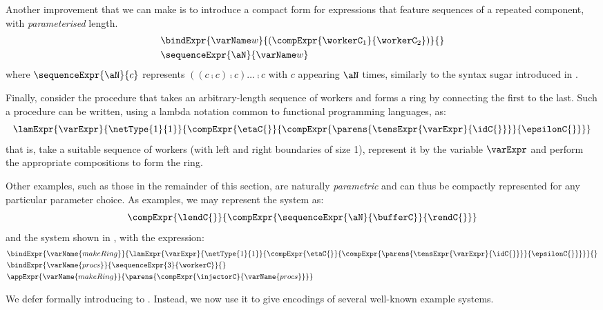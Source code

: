 Another improvement that we can make is to introduce a compact form for
expressions that feature sequences of a repeated component, with
\emph{parameterised}
length.
\begin{align*}
    &\bindExpr
        {\workerVar}
        {(\compExpr
            {\workerC_1}
            {\workerC_2})}{} \\
    &\sequenceExpr{\aN}{\workerVar}
\end{align*}
where $\sequenceExpr{\aN}{c}$ represents $((c \comp c) \comp c) \dots \comp c$
with $c$ appearing $\aN$ times, similarly to the syntax sugar introduced in
.

Finally, consider the procedure that takes an arbitrary-length sequence of
workers and forms a ring by connecting the first to the last. Such a procedure
can be written, using a lambda notation common to functional programming
languages, as:
\[
    \lamExpr{\varExpr}{\netType{1}{1}}
        {\compExpr{\etaC{}}
                  {\compExpr{\parens{\tensExpr{\varExpr}{\idC{}}}}
                            {\epsilonC{}}}}
\]
that is, take a suitable sequence of workers (with left and right boundaries of
size 1), represent it by the variable $\varExpr$ and perform the appropriate
compositions to form the ring.

Other examples, such as those in the remainder of this section, are naturally
\emph{parametric} and can thus be compactly represented for any particular
parameter choice. As examples, we may represent the \bufferSys{\aN} system
as:
\[
    \compExpr{\lendC{}}{\compExpr{\sequenceExpr{\aN}{\bufferC}}{\rendC{}}}
\]
and the  system shown in , with the
expression:
\begin{align*}
    &\bindExpr
        {\varName{makeRing}}
        {\lamExpr{\varExpr}{\netType{1}{1}}
                 {\compExpr{\etaC{}}
                           {\compExpr{\parens{\tensExpr{\varExpr}{\idC{}}}}
                                     {\epsilonC{}}}}}
        {}\\
    &\bindExpr
        {\varName{procs}}
        {\sequenceExpr{3}{\workerC}}
        {}\\
    &\appExpr{\varName{makeRing}}{\parens{\compExpr{\injectorC}{\varName{procs}}}}
\end{align*}

We defer formally introducing \DSL{} to . Instead, we now use
it to give encodings of several well-known example systems.
